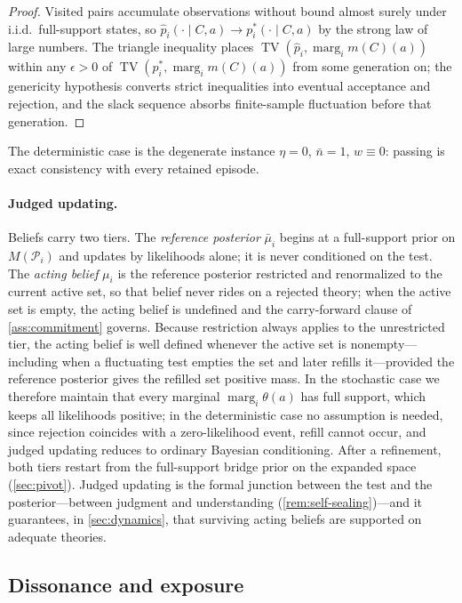 \documentclass[11pt]{article}
\theoremstyle{definition}
\newcommand{\TV}{\operatorname{TV}}
\newcommand{\marg}[1]{\operatorname{marg}_{#1}}
\begin{document}
\begin{proof}
Visited pairs accumulate observations without bound almost surely under
i.i.d.\ full-support states, so
$\hat p_i(\cdot\mid C,a)\to p_i^{*}(\cdot\mid C,a)$ by the strong law of
large numbers.  The triangle inequality places
$\TV(\hat p_i,\marg{i}m(C)(a))$ within any $\epsilon>0$ of
$\TV(p_i^{*},\marg{i}m(C)(a))$ from some generation on; the genericity
hypothesis converts strict inequalities into eventual acceptance and
rejection, and the slack sequence absorbs finite-sample fluctuation before
that generation.
\end{proof}

The deterministic case is the degenerate instance $\eta=0$, $\bar n=1$,
$w\equiv0$: passing is exact consistency with every retained episode.

\paragraph{Judged updating.}
Beliefs carry two tiers.  The \emph{reference posterior} $\bar\mu_i$ begins
at a full-support prior on $M(\mathcal P_i)$ and updates by likelihoods
alone; it is never conditioned on the test.  The \emph{acting belief}
$\mu_i$ is the reference posterior restricted and renormalized to the
current active set, so that belief never rides on a rejected theory; when
the active set is empty, the acting belief is undefined and the
carry-forward clause of \cref{ass:commitment} governs.  Because restriction
always applies to the unrestricted tier, the acting belief is well defined
whenever the active set is nonempty---including when a fluctuating test
empties the set and later refills it---provided the reference posterior
gives the refilled set positive mass.  In the stochastic case we therefore
maintain that every marginal $\marg{i}\theta(a)$ has full support, which
keeps all likelihoods positive; in the deterministic case no assumption is
needed, since rejection coincides with a zero-likelihood event, refill
cannot occur, and judged updating reduces to ordinary Bayesian
conditioning.  After a refinement, both tiers restart from the full-support
bridge prior on the expanded space (\cref{sec:pivot}).  Judged updating is
the formal junction between the test and the posterior---between judgment
and understanding (\cref{rem:self-sealing})---and it guarantees, in
\cref{sec:dynamics}, that surviving acting beliefs are supported on adequate
theories.

\subsection{Dissonance and exposure}
\end{document}
